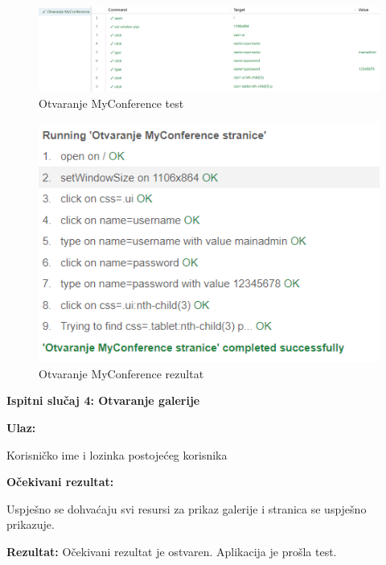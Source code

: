     \begin{figure}[H]
            \includegraphics[width = \textwidth]{slike/MyConferenceTest.png}
			
			\centering
			\caption{Otvaranje MyConference test}
			\label{fig:myConferenceTest}
			\end{figure}

   \begin{figure}[H]
            \includegraphics[scale = 0.8]{slike/MyConferenceRez.png}
			
			\centering
			\caption{Otvaranje MyConference rezultat}
			\label{fig:myConferenceRez}
			\end{figure}

   \textbf{Ispitni slučaj 4: Otvaranje galerije\newline}

  \newLine
   
   \textbf{Ulaz:}
   \begin{packed_item}
            \item Korisničko ime i lozinka postojećeg korisnika
   \end{packed_item}

   \textbf{Očekivani rezultat:}
   \begin{packed_item}
   \item[] \begin{packed_enum}
				
				\item Uspješno se dohvaćaju svi resursi za prikaz galerije i stranica se uspješno prikazuje. 
				
			\end{packed_enum}
   \end{packed_item}
   \textbf{Rezultat:} \text Očekivani rezultat je ostvaren. \color{red} Aplikacija je prošla test. \color{black}

